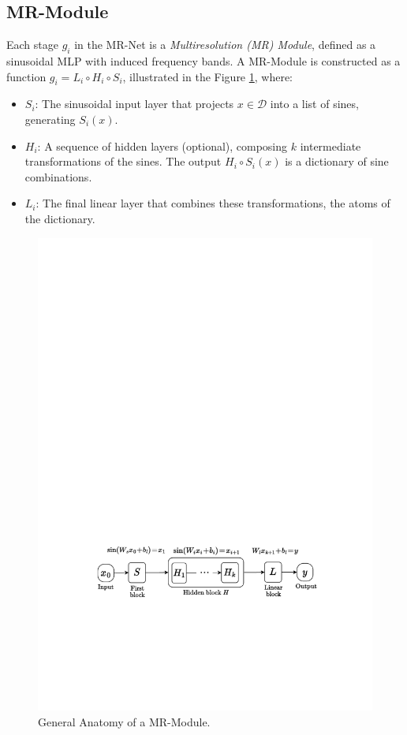\subsection{MR-Module}
\label{s-mr-module}

Each stage \( g_i \) in the MR-Net is a \textit{Multiresolution (MR) Module}, defined as a sinusoidal MLP with induced frequency bands. A MR-Module is constructed as a function \( g_i = L_i \circ H_i \circ S_i \), illustrated in the Figure \ref{f:mr-module}, where:

\begin{itemize}
    \item \( S_i \): The sinusoidal input layer that projects \( x \in \mathcal{D} \) into a list of sines, generating \( S_i(x) \).
    \item \( H_i \): A sequence of hidden layers (optional), composing \( k \) intermediate transformations of the sines. The output $H_i\circ S_i(x)$ is a dictionary of sine combinations.
    \item \( L_i \): The final linear layer that combines these transformations, the atoms of the dictionary.
\end{itemize}


\begin{figure}[!h]
    \centering
    \includegraphics[width=0.9\linewidth]{img/ch4/diagram_mr_module.pdf}
    \caption{General Anatomy of a MR-Module.}
    \label{f:mr-module}
\end{figure}

